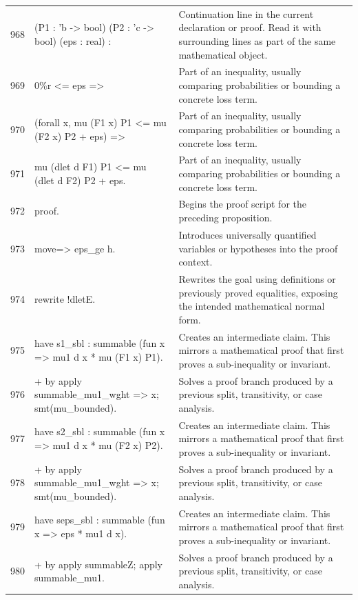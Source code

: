 \documentclass[10pt]{article}
\begin{document}
\begin{longtable}{r L{0.53\textwidth} L{0.37\textwidth}}
968 & {\ttfamily\scriptsize    (P1 : 'b -> bool) (P2 : 'c -> bool) (eps : real) :} & Continuation line in the current declaration or proof.  Read it with surrounding lines as part of the same mathematical object. \\
969 & {\ttfamily\scriptsize   0\%r <= eps =>} & Part of an inequality, usually comparing probabilities or bounding a concrete loss term. \\
970 & {\ttfamily\scriptsize   (forall x, mu (F1 x) P1 <= mu (F2 x) P2 + eps) =>} & Part of an inequality, usually comparing probabilities or bounding a concrete loss term. \\
971 & {\ttfamily\scriptsize   mu (dlet d F1) P1 <= mu (dlet d F2) P2 + eps.} & Part of an inequality, usually comparing probabilities or bounding a concrete loss term. \\
972 & {\ttfamily\scriptsize proof.} & Begins the proof script for the preceding proposition. \\
973 & {\ttfamily\scriptsize move=> eps\_ge h.} & Introduces universally quantified variables or hypotheses into the proof context. \\
974 & {\ttfamily\scriptsize rewrite !dletE.} & Rewrites the goal using definitions or previously proved equalities, exposing the intended mathematical normal form. \\
975 & {\ttfamily\scriptsize have s1\_sbl : summable (fun x => mu1 d x * mu (F1 x) P1).} & Creates an intermediate claim.  This mirrors a mathematical proof that first proves a sub-inequality or invariant. \\
976 & {\ttfamily\scriptsize + by apply summable\_mu1\_wght => x; smt(mu\_bounded).} & Solves a proof branch produced by a previous split, transitivity, or case analysis. \\
977 & {\ttfamily\scriptsize have s2\_sbl : summable (fun x => mu1 d x * mu (F2 x) P2).} & Creates an intermediate claim.  This mirrors a mathematical proof that first proves a sub-inequality or invariant. \\
978 & {\ttfamily\scriptsize + by apply summable\_mu1\_wght => x; smt(mu\_bounded).} & Solves a proof branch produced by a previous split, transitivity, or case analysis. \\
979 & {\ttfamily\scriptsize have seps\_sbl : summable (fun x => eps * mu1 d x).} & Creates an intermediate claim.  This mirrors a mathematical proof that first proves a sub-inequality or invariant. \\
980 & {\ttfamily\scriptsize + by apply summableZ; apply summable\_mu1.} & Solves a proof branch produced by a previous split, transitivity, or case analysis. \\

\end{longtable}
\end{document}
